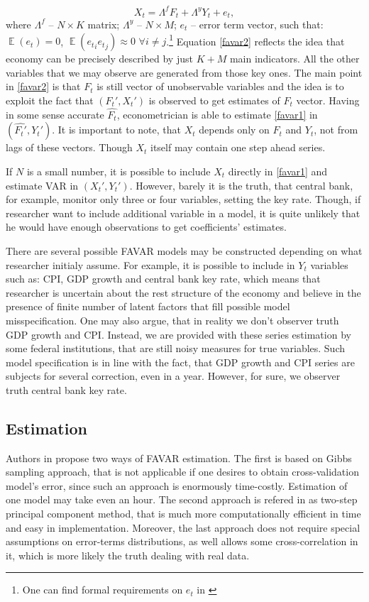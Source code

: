 \documentclass[a4paper, 14pt]{article}
\DeclareMathOperator*{\E}{\mathbb{E}}
\begin{document}
\begin{equation}\label{favar2}
	 X_t = \Lambda^f F_t + \Lambda^y Y_t + e_t,
\end{equation}
where $\Lambda^f$ -- $N \times K$ matrix; $\Lambda^y$ -- $N \times M$; $e_t$ -- error term vector, such that: $\E(e_t) = 0$, $\E({e_t}_i {e_t}_j) \approx 0$ $\forall i \neq j$.\footnote{One can find formal requirements on $e_t$ in \cite{stock2002macroeconomic}} Equation \eqref{favar2} reflects the idea that economy can be precisely described by just $K+M$ main indicators. All the other variables that we may observe are generated from those key ones. The main point in \eqref{favar2} is that $F_t$ is still vector of unobservable variables and the idea is to exploit the fact that $(F_t', X_t')$ is observed to get estimates of $F_t$ vector. Having in some sense accurate $\hat{F_t}$, econometrician is able to estimate \eqref{favar1} in $(\hat{F_t'}, Y_t')$. It is important to note, that $X_t$ depends only on $F_t$ and $Y_t$, not from lags of these vectors. Though $X_t$ itself may contain one step ahead series. 

If $N$ is a small number, it is possible to include $X_t$ directly in \eqref{favar1} and estimate VAR in $({X_t'}, Y_t')$. However, barely it is the truth, that central bank, for example, monitor only three or four variables, setting the key rate. Though, if researcher want to include additional variable in a model, it is quite unlikely that he would have enough observations to get coefficients' estimates. 

There are several possible FAVAR models may be constructed depending on what researcher initialy assume. For example, it is possible to include in $Y_t$ variables such as: CPI, GDP growth and central bank key rate, which means that researcher is uncertain about the rest structure of the economy and believe in the presence of finite number of latent factors that fill possible model misspecification. One may also argue, that in reality we don't observer truth GDP growth and CPI. Instead, we are provided with these series estimation by some federal institutions, that are still noisy measures for true variables. Such model specification is in line with the fact, that GDP growth and CPI series are subjects for several correction, even in a year. However, for sure, we observer truth central bank key rate.

\subsection{Estimation}
Authors in \cite{bernanke2005measuring} propose two ways of FAVAR estimation. The first is based on Gibbs sampling approach, that is not applicable if one desires to obtain cross-validation model's error, since such an approach is enormously time-costly. Estimation of one model may take even an hour.  The second approach is refered in \cite{bernanke2005measuring} as two-step principal component method, that is much more computationally efficient in time and easy in implementation. Moreover, the last approach does not require special assumptions on error-terms distributions, as well allows some cross-correlation in it, which is more likely the truth dealing with real data.
\end{document}
